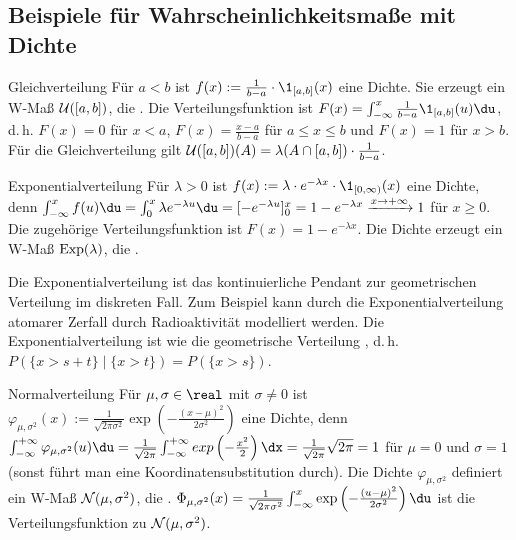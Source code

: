 \subsection{%
    Beispiele für Wahrscheinlichkeitsmaße mit Dichte%
}

\begin{Def}{Gleichverteilung}
    Für $a < b$ ist $f(x) := \frac{1}{b - a} \cdot \1_{[a,b]}(x)$ eine Dichte.
    Sie erzeugt ein W-Maß $\mathcal{U}([a, b])$,
    die .
    Die Verteilungsfunktion ist $F(x) = \int_{-\infty}^x \frac{1}{b - a} \1_{[a, b]}(u) \du$,
    d.\,h. $F(x) = 0$ für $x < a$, $F(x) = \frac{x - a}{b - a}$ für $a \le x \le b$
    und $F(x) = 1$ für $x > b$.
    Für die Gleichverteilung gilt $\mathcal{U}([a, b])(A) = \lambda(A \cap [a, b]) \cdot \frac{1}{b - a}$.
\end{Def}

\linie

\begin{Def}{Exponentialverteilung}
    Für $\lambda > 0$ ist $f(x) := \lambda \cdot e^{-\lambda x} \cdot \1_{[0, \infty)}(x)$
    eine Dichte, denn $\int_{-\infty}^x f(u)\du = \int_0^x \lambda e^{-\lambda u} \du =
    [-e^{-\lambda u}]_0^x = 1 - e^{-\lambda x} \xrightarrow{x \to +\infty} 1$ für $x \ge 0$.
    Die zugehörige Verteilungsfunktion ist $F(x) = 1 - e^{-\lambda x}$.
    Die Dichte erzeugt ein W-Maß $\text{Exp}(\lambda)$,
    die .
\end{Def}

\begin{Bem}
    Die Exponentialverteilung ist das kontinuierliche Pendant zur geometrischen Verteilung im
    diskreten Fall.
    Zum Beispiel kann durch die Exponentialverteilung atomarer Zerfall durch Radioaktivität
    modelliert werden.
    Die Exponentialverteilung ist wie die geometrische Verteilung , d.\,h.
    $P(\{x > s + t\} \;|\; \{x > t\}) = P(\{x > s\})$.
\end{Bem}

\linie

\begin{Def}{Normalverteilung}
    Für $\mu, \sigma \in \real$ mit $\sigma \not= 0$ ist
    $\varphi_{\mu,\sigma^2}(x) := \frac{1}{\sqrt{2\pi\sigma^2}}
    \exp\left(-\frac{(x - \mu)^2}{2\sigma^2}\right)$ eine Dichte,
    denn $\int_{-\infty}^{+\infty} \varphi_{\mu,\sigma^2}(u)\du =
    \frac{1}{\sqrt{2\pi}} \int_{-\infty}^{+\infty} exp\left(-\frac{x^2}{2}\right)\dx =
    \frac{1}{\sqrt{2\pi}} \sqrt{2\pi} = 1$ für $\mu = 0$ und $\sigma = 1$
    (sonst führt man eine Koordinatensubstitution durch).
    Die Dichte $\varphi_{\mu,\sigma^2}$ definiert ein W-Maß $\mathcal{N}(\mu, \sigma^2)$,
    die .
    $\Phi_{\mu,\sigma^2}(x) = \frac{1}{\sqrt{2\pi\sigma^2}}
    \int_{-\infty}^x \exp\left(-\frac{(u - \mu)^2}{2\sigma^2}\right) \du$
    ist die Verteilungsfunktion zu $\mathcal{N}(\mu, \sigma^2)$.
\end{Def}

